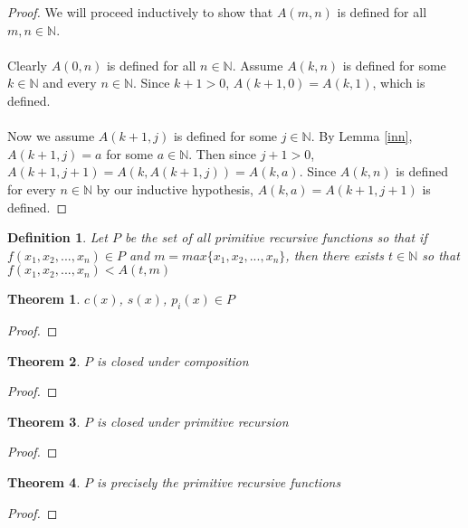 \documentclass[12pt, letterpaper]{article}
\newtheorem{theorem}{Theorem}
\newtheorem*{definition}{Definition}
\begin{document}
    \begin{proof}
      We will proceed inductively to show that $A(m, n)$ is defined for all $m, n \in \mathbb{N}$.
      \\ 
      \\
      Clearly $A(0, n)$ is defined for all $n \in \mathbb{N}$.
      Assume $A(k, n)$ is defined for some $k \in \mathbb{N}$ and every $n \in \mathbb{N}$.
      Since $k + 1 > 0$, $A(k + 1, 0) = A(k, 1)$, which is defined.
      \\
      \\
      Now we assume $A(k + 1, j)$ is defined for some $j \in \mathbb{N}$.
      By Lemma \ref{inn}, $A(k + 1, j) = a$ for some $a \in \mathbb{N}$.
      Then since $j + 1 > 0$, $A(k + 1, j + 1) = A(k, A(k + 1, j)) = A(k, a)$.
      Since $A(k, n)$ is defined for every $n \in \mathbb{N}$ by our inductive hypothesis,
      $A(k, a) = A(k + 1, j + 1)$ is defined.
    \end{proof}
    
    \begin{definition}
      Let $P$ be the set of all primitive recursive functions so that if $f(x_1, x_2, ..., x_n) \in P$ and
      $m = max\{x_1, x_2, ..., x_n\}$, then there exists $t \in \mathbb{N}$ so that 
      $f(x_1, x_2, ..., x_n) < A(t, m)$
    \end{definition}

    \begin{theorem}
      $c(x)$, $s(x)$, $p_i(x) \in P$
    \end{theorem}
    \begin{proof}
    \end{proof}

    \begin{theorem}
      $P$ is closed under composition
    \end{theorem}
    \begin{proof}
      
    \end{proof}

    \begin{theorem}
      $P$ is closed under primitive recursion
    \end{theorem}
    \begin{proof}
      
    \end{proof}

    \begin{theorem}
      $P$ is precisely the primitive recursive functions
    \end{theorem}
    \begin{proof}
    \end{proof}
\end{document}
